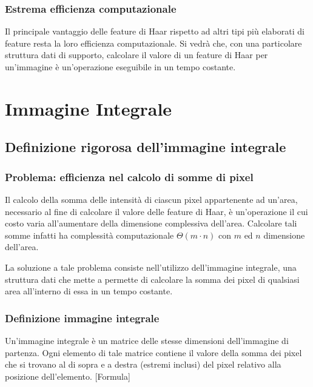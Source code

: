            \subsubsection{Estrema efficienza computazionale}
            Il principale vantaggio delle feature di Haar rispetto ad altri tipi più elaborati di feature resta la loro efficienza computazionale.
            Si vedrà che, con una particolare struttura dati di supporto, calcolare il valore di un feature di Haar per un'immagine è un'operazione eseguibile in un tempo costante.
    \section{Immagine Integrale}
    \label{sec:integral_image}
        \subsection{Definizione rigorosa dell'immagine integrale}
            \subsubsection{Problema: efficienza nel calcolo di somme di pixel}
                Il calcolo della somma delle intensità di ciascun pixel appartenente ad un'area, necessario al fine di calcolare il valore delle feature di Haar, è un'operazione il cui costo varia all'aumentare della dimensione complessiva dell'area.
                Calcolare tali somme infatti ha complessità computazionale $\Theta(m \cdot n)$ con $m$ ed $n$ dimensione dell'area.

                La soluzione a tale problema consiste nell'utilizzo dell'immagine integrale, una struttura dati che mette a permette di calcolare la somma dei pixel di qualsiasi area all'interno di essa in un tempo costante.
            \subsubsection{Definizione immagine integrale}
                Un'immagine integrale è un matrice delle stesse dimensioni dell'immagine di partenza.
                Ogni elemento di tale matrice contiene il valore della somma dei pixel che si trovano al di sopra e a destra (estremi inclusi) del pixel relativo alla posizione dell'elemento.
                [Formula]
